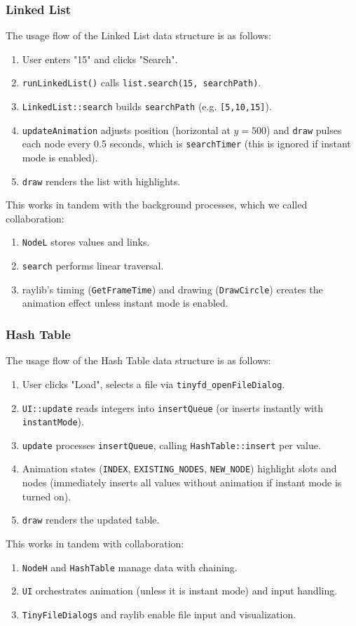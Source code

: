 \documentclass{article}
\begin{document}
\subsubsection{Linked List}
The usage flow of the Linked List data structure is as follows:
\begin{enumerate}
	\item User enters "15" and clicks "Search".
	\item \lstinline|runLinkedList()| calls \lstinline|list.search(15, searchPath)|.
	\item \lstinline|LinkedList::search| builds \lstinline|searchPath| (e.g. \lstinline|[5,10,15]|).
	\item \lstinline|updateAnimation| adjusts position (horizontal at $y = 500$) and \lstinline|draw| pulses each node every 0.5 seconds, which is \lstinline|searchTimer| (this is ignored if instant mode is enabled).
	\item \lstinline|draw| renders the list with highlights.
\end{enumerate}
This works in tandem with the background processes, which we called collaboration:
\begin{enumerate}
	\item \lstinline|NodeL| stores values and links.
	\item \lstinline|search| performs linear traversal.
	\item raylib's timing (\lstinline|GetFrameTime|) and drawing (\lstinline|DrawCircle|) creates the animation effect unless instant mode is enabled.
\end{enumerate}

\subsubsection{Hash Table}
The usage flow of the Hash Table data structure is as follows:
\begin{enumerate}
	\item User clicks "Load", selects a file via \lstinline|tinyfd_openFileDialog|.
	\item \lstinline|UI::update| reads integers into \lstinline|insertQueue| (or inserts instantly with \lstinline|instantMode|).
	\item \lstinline|update| processes \lstinline|insertQueue|, calling \lstinline|HashTable::insert| per value.
	\item Animation states (\lstinline|INDEX|, \lstinline|EXISTING_NODES|, \lstinline|NEW_NODE|) highlight slots and nodes (immediately inserts all values without animation if instant mode is turned on).
	\item \lstinline|draw| renders the updated table.
\end{enumerate}
This works in tandem with collaboration:
\begin{enumerate}
	\item \lstinline|NodeH| and \lstinline|HashTable| manage data with chaining.
	\item \lstinline|UI| orchestrates animation (unless it is instant mode) and input handling.
	\item \lstinline|TinyFileDialogs| and raylib enable file input and visualization.
\end{enumerate}
\end{document}
